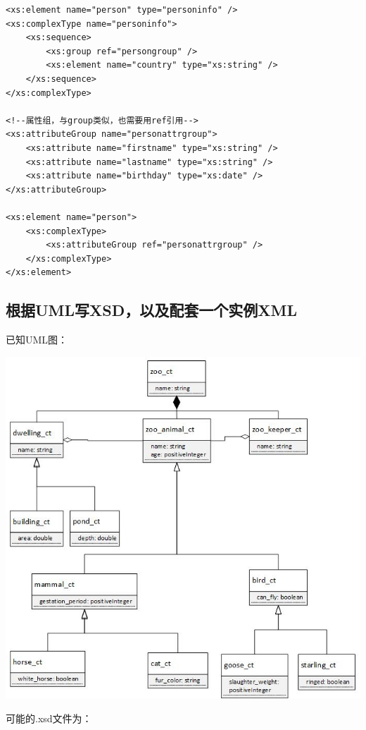 \documentclass[fontset=windows]{article}
\begin{document}
\begin{verbatim}
<xs:element name="person" type="personinfo" />
<xs:complexType name="personinfo">
	<xs:sequence>
		<xs:group ref="persongroup" />
		<xs:element name="country" type="xs:string" />
	</xs:sequence>
</xs:complexType>

<!--属性组，与group类似，也需要用ref引用-->
<xs:attributeGroup name="personattrgroup">
	<xs:attribute name="firstname" type="xs:string" />
	<xs:attribute name="lastname" type="xs:string" />
	<xs:attribute name="birthday" type="xs:date" />
</xs:attributeGroup>

<xs:element name="person">
	<xs:complexType>
		<xs:attributeGroup ref="personattrgroup" />
	</xs:complexType>
</xs:element>
\end{verbatim}

\subsection{根据UML写XSD，以及配套一个实例XML}

已知UML图：

\begin{center}
\includegraphics[scale=0.8]{9.jpg}
\end{center}

可能的.xsd文件为：
\end{document}
